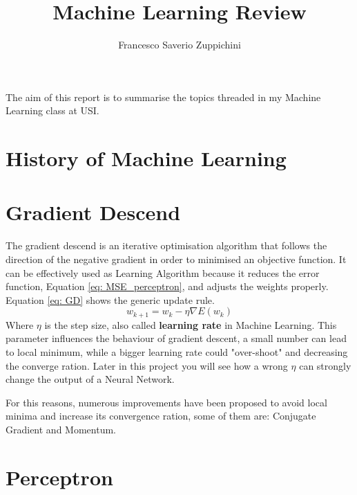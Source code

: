 \documentclass[11pt]{article}
\title{Machine Learning Review}
\author{Francesco Saverio Zuppichini}
\begin{document}
\maketitle
The aim of this report is to summarise the topics threaded in my Machine Learning class at USI.
\section{History of Machine Learning}

\section{Gradient Descend}
The gradient descend is an iterative optimisation algorithm that follows the direction of the negative gradient in order to minimised an objective function. It can be effectively used as Learning Algorithm because it reduces the error function, Equation \ref{eq: MSE_perceptron}, and adjusts the weights properly. Equation \ref{eq: GD} shows the generic update rule.
\begin{equation}
\label{eq: gradient_descent}
	w_{k + 1} = w_k - \eta \nabla E(w_k)
\end{equation}
Where $\eta$ is the step size, also called \textbf{learning rate} in Machine Learning. This parameter influences the behaviour of gradient descent, a small number can lead to local minimum, while a bigger learning rate could "over-shoot" and decreasing the converge ration. Later in this project you will see how a wrong $\eta$ can strongly change the output of a Neural Network.

For this reasons, numerous improvements have been proposed to avoid local minima and increase its convergence ration, some of them are: Conjugate Gradient and Momentum.
\section{Perceptron}
\end{document}
